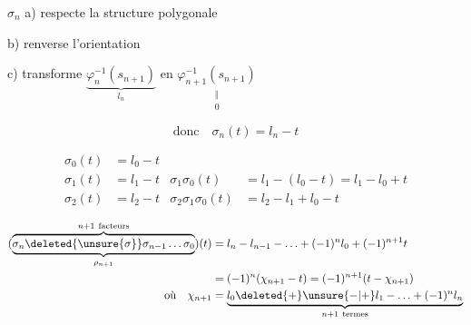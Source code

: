 

$\sigma_n$ \quad a) respecte la structure polygonale

b) renverse l'orientation

c) transforme $\underbrace{\varphi_n^{-1}(s_{n+1})}_{l_n}$ en $\underset{\substack{\Vert\\0}}{\varphi_{n+1}^{-1}(s_{n+1})}$

\[ \text{donc}\quad \sigma_n(t)=l_n-t \]

\[ \begin{aligned}
\sigma_0(t)&=l_0-t\\
\sigma_1(t)&=l_1-t &\sigma_1\sigma_0(t)&=l_1-(l_0-t)=l_1-l_0+t\\
\sigma_2(t)&=l_2-t &\sigma_2\sigma_1\sigma_0(t)&=l_2-l_1+l_0-t
\end{aligned} \]

\[ \begin{aligned}
(\underbrace{\overbrace{\sigma_n\deleted{\unsure{\sigma}}\sigma_{n-1}\ldots\sigma_0}^{n+1\ \text{facteurs}}}_{\rho_{n+1}})(t)&=l_n-l_{n-1}-\ldots+(-1)^n l_0+(-1)^{n+1}t\\
&=(-1)^n(\chi_{n+1}-t)=(-1)^{n+1}(t-\chi_{n+1})\\
\text{où}\quad \chi_{n+1}&=\underbrace{l_0\deleted{+}\unsure{-|+}l_1-\ldots+(-1)^n l_n}_{n+1\ \text{termes}}
\end{aligned} \]
